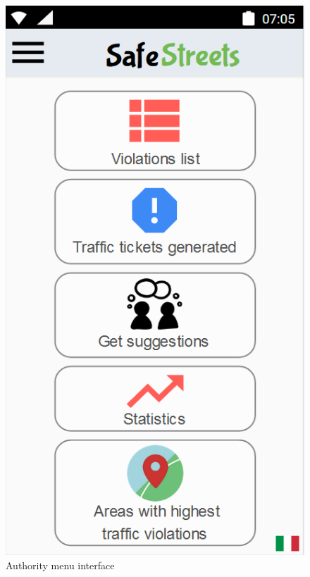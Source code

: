     
        \begin{figure}[h]
        \centering
        \includegraphics[scale=0.5]{Images/authority_menu.png}
        \caption{Authority menu interface}
    \end{figure}
